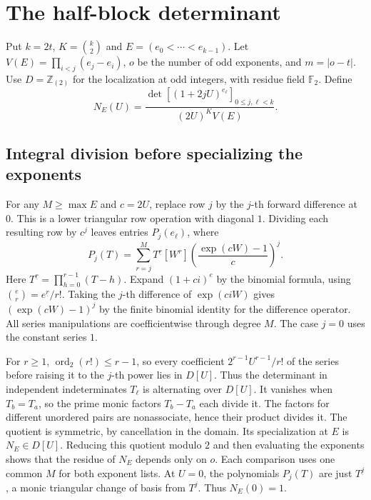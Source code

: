 \documentclass[10pt]{article}
\newcommand{\Z}{\mathbb Z}
\newcommand{\Fp}{\mathbb F}
\newcommand{\ord}{\operatorname{ord}}
\begin{document}
\section{The half-block determinant}\label{sec:half}
Put $k=2t$, $K=\binom{k}{2}$ and $E=(e_0<\cdots<e_{k-1})$.
Let $V(E)=\prod_{i<j}(e_j-e_i)$, $o$ be the number of odd exponents, and
$m=|o-t|$. Use $D=\Z_{(2)}$ for the localization at odd integers, with
residue field $\Fp_2$. Define
\[
 N_E(U)=
 \frac{\det[(1+2jU)^{e_\ell}]_{0\le j,\ell<k}}{(2U)^K V(E)} .
\]

\subsection{Integral division before specializing the exponents}
For any $M\ge\max E$ and $c=2U$, replace row $j$ by the $j$-th
forward difference at $0$. This is a lower triangular row operation with
diagonal $1$. Dividing each resulting row by $c^j$ leaves entries
$P_j(e_\ell)$, where
\begin{equation}\label{eq:fd}
 P_j(T)=\sum_{r=j}^{M} T^{\underline r}
 [W^r]\left(\frac{\exp(cW)-1}{c}\right)^j .
\end{equation}
Here $T^{\underline r}=\prod_{h=0}^{r-1}(T-h)$.
Expand $(1+ci)^e$ by the binomial formula, using
$\binom er=e^{\underline r}/r!$. Taking the $j$-th difference of
$\exp(ciW)$ gives $(\exp(cW)-1)^j$ by the finite binomial identity for
the difference operator. All series manipulations are coefficientwise
through degree $M$. The case $j=0$ uses the constant series $1$.

For $r\ge1$, $\ord_2(r!)\le r-1$, so every coefficient
$2^{r-1} U^{r-1}/r!$ of the series before raising it to the $j$-th
power lies in $D[U]$. Thus the determinant in independent
indeterminates $T_\ell$ is alternating over $D[U]$. It vanishes when
$T_b=T_a$, so the prime monic factors $T_b-T_a$ each divide it.
The factors for different unordered pairs are nonassociate, hence
their product divides it. The quotient is symmetric, by cancellation
in the domain. Its specialization at $E$ is $N_E\in D[U]$.
Reducing this quotient modulo $2$ and then evaluating the exponents
shows that the residue of $N_E$ depends only on $o$. Each comparison
uses one common $M$ for both exponent lists. At $U=0$, the polynomials
$P_j(T)$ are just $T^{\underline j}$, a monic triangular change of
basis from $T^j$. Thus $N_E(0)=1$.
\end{document}
